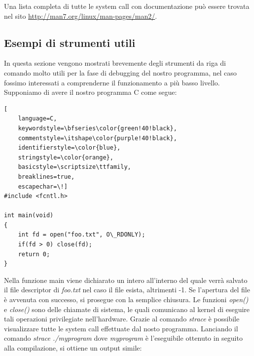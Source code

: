 Una lista completa di tutte le system call con documentazione può essere trovata nel sito \url{http://man7.org/linux/man-pages/man2/}.

\subsection{Esempi di strumenti utili}
In questa sezione vengono mostrati brevemente degli strumenti da riga di comando molto utili per la fase di debugging del nostro programma, nel caso fossimo interessati a comprenderne il funzionamento a più basso livello.
Supponiamo di avere il nostro programma C come segue:

\begin{lstlisting}[
  	language=C,
  	keywordstyle=\bfseries\color{green!40!black},
  	commentstyle=\itshape\color{purple!40!black},
  	identifierstyle=\color{blue},
  	stringstyle=\color{orange},
    basicstyle=\scriptsize\ttfamily,
    breaklines=true,
    escapechar=\!]
#include <fcntl.h>

int main(void)
{
	int fd = open("foo.txt", O\_RDONLY);
	if(fd > 0) close(fd);
	return 0;
}
\end{lstlisting}

Nella funzione main viene dichiarato un intero all'interno del quale verrà salvato il file descriptor di \emph{foo.txt} nel caso il file esista, altrimenti -1. Se l'apertura del file è avvenuta con successo, si prosegue con la semplice chiusura.
Le funzioni \emph{open()} e \emph{close()} sono delle chiamate di sistema, le quali comunicano al kernel di eseguire tali operazioni privilegiate nell'hardware.
Grazie al comando \emph{strace} è possibile visualizzare tutte le system call effettuate dal nosto programma. Lanciando il comando \emph{strace ./myprogram} dove \emph{myprogram} è l'eseguibile ottenuto in seguito alla compilazione, si ottiene un output simile:

